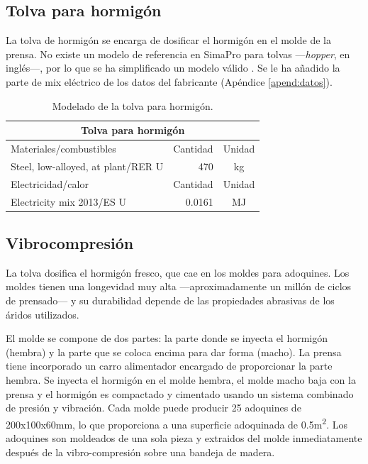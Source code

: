 \subsection{Tolva para hormigón}

La tolva de hormigón se encarga de dosificar el hormigón en el molde de la prensa. No existe un modelo de referencia en SimaPro para tolvas —\textit{hopper}, en inglés—, por lo que se ha simplificado un modelo válido \cite{foodnottrash}. Se le ha añadido la parte de mix eléctrico de los datos del fabricante (Apéndice \ref{apend:datos}).

\begin{table}[!htb]
\centering
\begin{tabular}{p{8cm}rc}
\toprule
\multicolumn{3}{c}{Tolva para hormigón}\\
\midrule
Materiales/combustibles & Cantidad & Unidad\\
\midrule
Steel, low-alloyed, at plant/RER U & 470 & \si{kg}\\
\midrule
Electricidad/calor & Cantidad & Unidad\\
\midrule
Electricity mix 2013/ES U & 0.0161 & \si{MJ}\\
\bottomrule
\end{tabular}
\caption{Modelado de la tolva para hormigón.}
\label{modeladotolvahormigon}
\end{table}

\subsection{Vibrocompresión}

La tolva dosifica el hormigón fresco, que cae en los moldes para adoquines. Los moldes tienen una longevidad muy alta —aproximadamente un millón de ciclos de prensado— y su durabilidad depende de las propiedades abrasivas de los áridos utilizados.

El molde se compone de dos partes: la parte donde se inyecta el hormigón (hembra) y la parte que se coloca encima para dar forma (macho). La prensa tiene incorporado un carro alimentador encargado de proporcionar la parte hembra. Se inyecta el hormigón en el molde hembra, el molde macho baja con la prensa y el hormigón es compactado y cimentado usando un sistema combinado de presión y vibración. Cada molde puede producir 25 adoquines de 200x100x60\si{\milli\meter}, lo que proporciona a una superficie adoquinada de 0.5\si{\square\meter}. Los adoquines son moldeados de una sola pieza y extraidos del molde inmediatamente después de la vibro-compresión sobre una bandeja de madera.

